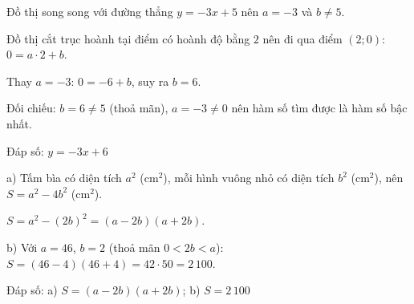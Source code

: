 \begin{problem}[8DS-HSBN-005]
Đồ thị song song với đường thẳng $y = -3x + 5$ nên $a = -3$ và $b \neq 5$.

Đồ thị cắt trục hoành tại điểm có hoành độ bằng $2$ nên đi qua điểm $(2; 0)$: $0 = a \cdot 2 + b$.

Thay $a = -3$: $0 = -6 + b$, suy ra $b = 6$.

Đối chiếu: $b = 6 \neq 5$ (thoả mãn), $a = -3 \neq 0$ nên hàm số tìm được là hàm số bậc nhất.

Đáp số: $y = -3x + 6$
\end{problem}

\begin{problem}[8DS-PTNT-004]
a) Tấm bìa có diện tích $a^2$ (cm$^2$), mỗi hình vuông nhỏ có diện tích $b^2$ (cm$^2$), nên $S = a^2 - 4b^2$ (cm$^2$).

$S = a^2 - (2b)^2 = (a - 2b)(a + 2b)$.

b) Với $a = 46$, $b = 2$ (thoả mãn $0 < 2b < a$): $S = (46 - 4)(46 + 4) = 42 \cdot 50 = 2\,100$.

Đáp số: a) $S = (a - 2b)(a + 2b)$; b) $S = 2\,100$
\end{problem}
